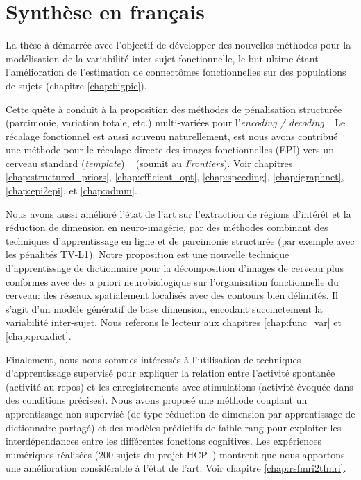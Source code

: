 \chapter{\;\;Synthèse en français}\label{chap:synthese}

La thèse à démarrée avec l'objectif de développer des nouvelles méthodes pour la modélisation de la variabilité inter-sujet fonctionnelle, le but ultime étant l'amélioration de l'estimation de connectômes fonctionnelles sur des populations de sujets (chapitre \ref{chap:bigpic}).


Cette quête à conduit à la proposition des méthodes de pénalisation structurée (parcimonie, variation totale, etc.) multi-variées pour l'\textit{encoding / decoding}~\citep{dohmatob2015speeding,abrahamregion,eickenberg2015total,pelle2016multivariate}. Le récalage fonctionnel est aussi souvenu naturellement, est nous avons contribué une méthode pour le récalage directe des images fonctionnelles (EPI) vers un cerveau standard (\textit{template}) ~\citep{dohmatob2016epi2epi} (soumit au \textit{Frontiers}). Voir chapitres \ref{chap:structured_priors}, \ref{chap:efficient_opt}, \ref{chap:speeding}, \ref{chap:igraphnet}, \ref{chap:epi2epi}, et \ref{chap:admm}.

Nous avons aussi amélioré l'état de l'art sur l'extraction de régions d'intérêt et la réduction de dimension en neuro-imagérie, par des méthodes combinant des techniques d'apprentissage en ligne et de parcimonie structurée (par exemple avec les pénalités TV-L1). Notre proposition est une nouvelle technique d'apprentissage de dictionnaire pour la décomposition d'images de cerveau plus conformes avec des a priori neurobiologique sur l'organisation fonctionnelle du cerveau: des réseaux spatialement localisés avec des contours bien délimités. Il s'agit d'un modèle génératif de base dimension, encodant succinctement la variabilité inter-sujet. Nous referons le lecteur aux chapitres \ref{chap:func_var} et \ref{chap:proxdict}.

Finalement, nous nous sommes intéressés à l’utilisation de techniques d’apprentissage supervisé pour expliquer la relation entre l’activité spontanée (activité au repos) et les enregistrements avec stimulations (activité évoquée dans des conditions précises). Nous avons proposé une méthode couplant un apprentissage non-supervisé (de type réduction de dimension par apprentissage de dictionnaire partagé) et des modèles prédictifs de faible rang pour exploiter les interdépendances entre les différentes fonctions cognitives. Les expériences numériques réalisées (200 sujets du projet HCP~\citep{VanEssen20122222}) montrent que nous apportons une amélioration considérable à l'état de l'art. Voir chapitre \ref{chap:rsfmri2tfmri}.

